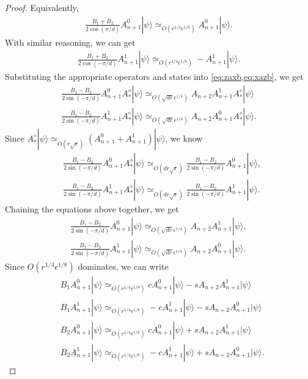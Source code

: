 \documentclass[11pt,letterpaper]{article}
\newcommand{\ket}[1]{|#1\rangle}
\newcommand{\1}{\mathbb{1}}
\newcommand{\ep}{\epsilon}
\newcommand{\se}{\sqrt{\epsilon}}
\newcommand{\qe}{\epsilon^{1/4}}
\newcommand{\appd}[1]{\simeq_{#1}}
\theoremstyle{definition}
\begin{document}
\begin{proof}
        Equivalently,
        \begin{align}
        		\frac{B_1+B_2}{2 \cos(\pi/d)} A_{n+1}^0 \ket{\psi} \appd{O(r^{1/4} \ep^{1/8})} A_{n+1}^0 \ket{\psi}.
        \end{align}
        With similar reasoning, we can get
        \begin{align}
        		\frac{B_1+B_2}{2 \cos(-\pi/d)} A_{n+1}^1 \ket{\psi} \appd{O(r^{1/4} \ep^{1/8})} -A_{n+1}^1 \ket{\psi}.
        \end{align}
	Substituting the appropriate operators and states into \cref{eq:zaxb,eq:xazb}, we get
	\begin{align}
		\frac{B_1-B_2}{2 \sin(-\pi/d)} A_{n+1}^0A_\ast^\diamond \ket{\psi} 
		\appd{O(\sqrt{dr} \qe)}A_{n+2} A_{n+1}^1A_\ast^\diamond\ket{\psi}\\
		\frac{B_1 -B_2}{2\sin(-\pi/d)} A_{n+1}^1A_\ast^\diamond \ket{\psi}  
		\appd{O(\sqrt{dr} \qe)}A_{n+2} A_{n+1}^0 A_\ast^\diamond \ket{\psi}.
	\end{align}
	Since $A_\ast^\diamond \ket{\psi} \appd{O(r\se)} (A_{n+1}^0 + A_{n+1}^1) \ket{\psi}$, we know
	\begin{align}
		&\frac{B_1-B_2}{2 \sin(-\pi/d)} A_{n+1}^0A_\ast^\diamond \ket{\psi}  
		\appd{O(dr \se)} \frac{B_1-B_2}{2 \sin(-\pi/d)} A_{n+1}^0 \ket{\psi},\\
		&\frac{B_1-B_2}{2 \sin(-\pi/d)} A_{n+1}^1A_\ast^\diamond \ket{\psi}  
		\appd{O(dr \se)} \frac{B_1-B_2}{2 \sin(-\pi/d)} A_{n+1}^1 \ket{\psi}.
	\end{align}
	Chaining the equations above together,
	we get
	\begin{align}
		\frac{B_1-B_2}{2 \sin(-\pi/d)} A_{n+1}^0 \ket{\psi} \appd{O(\sqrt{dr}\qe)}A_{n+2} A_{n+1}^1 \ket{\psi},\\
		\frac{B_1-B_2}{2 \sin(-\pi/d)} A_{n+1}^1 \ket{\psi}\appd{O(\sqrt{dr}\qe)} A_{n+2} A_{n+1}^0 \ket{\psi}.
	\end{align}
	Since $O(r^{1/4} \ep^{1/8})$ dominates, we can write 
        \begin{align}
        		&B_1A_{n+1}^0 \ket{\psi} \appd{O(r^{1/4} \ep^{1/8})} cA_{n+1}^0\ket{\psi} - sA_{n+2}A_{n+1}^1\ket{\psi}\\
        		&B_1A_{n+1}^1 \ket{\psi} \appd{O(r^{1/4} \ep^{1/8})} -cA_{n+1}^1\ket{\psi} - sA_{n+2}A_{n+1}^0\ket{\psi}\\
        		&B_2A_{n+1}^0 \ket{\psi} \appd{O(r^{1/4} \ep^{1/8})} cA_{n+1}^0\ket{\psi} + sA_{n+2}A_{n+1}^1\ket{\psi}\\
        		&B_2A_{n+1}^1 \ket{\psi} \appd{O(r^{1/4} \ep^{1/8})} -cA_{n+1}^1\ket{\psi} + sA_{n+2}A_{n+1}^0\ket{\psi}.

\end{align}
\end{proof}
\end{document}
